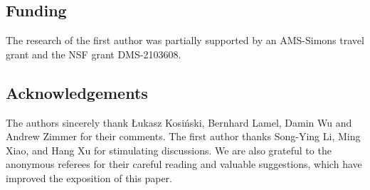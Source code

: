 \documentclass[12pt] {article}
\numberwithin{equation}{section}
\begin{document}
\subsection*{Funding}
The research of the first author was partially supported by an AMS-Simons travel grant and the NSF grant DMS-2103608.
 
  

\subsection*{Acknowledgements} 


 The authors sincerely thank \L{}ukasz Kosiński, Bernhard Lamel, Damin Wu and Andrew Zimmer for their comments. The first author thanks Song-Ying Li, Ming Xiao, and Hang Xu for stimulating discussions. We are also grateful to the anonymous referees for their careful reading and valuable suggestions, which have improved the exposition of this paper.
  
\end{document}
